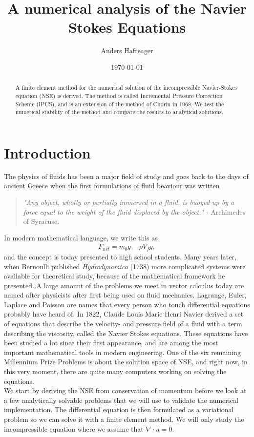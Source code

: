 \documentclass[a4paper,10pt]{article}
\title{A numerical analysis of the Navier Stokes Equations}
\date{\today}
\author{Anders Hafreager}
\renewcommand{\(}{\left(}
\renewcommand{\)}{\right)}
\begin{document}
\maketitle
\begin{abstract}
A finite element method for the numerical solution of the incompressible Navier-Stokes equation (NSE) is derived. The method is called Incremental Pressure Correction Scheme (IPCS)\cite{ns_numerical_solutions}, and is an extension of the method of Chorin in 1968\cite{chorin}. We test the numerical stability of the method and compare the results to analytical solutions.
\end{abstract}

\section{Introduction}
The physics of fluids has been a major field of study and goes back to the days of ancient Greece \cite{wiki_fluid_mechanics} when the first formulations of fluid beaviour was written
\begin{quote}
\textit{"Any object, wholly or partially immersed in a fluid, is buoyed up by a force equal to the weight of the fluid displaced by the object."} - Archimedes of Syracuse.
\end{quote}
In modern mathematical language, we write this as 
\begin{align*}
  F_{net} = m_bg - \rho V_f g,
\end{align*}
and the concept is today presented to high school students. Many years later, when Bernoulli published \textit{Hydrodynamica} (1738) more complicated systems were available for theoretical study, because of the mathematical framework he presented. A large amount of the problems we meet in vector calculus today are named after physicists after first being used on fluid mechanics. Lagrange, Euler, Laplace and Poisson are names that every person who touch differential equations probably have heard of. In 1822, Claude Louis Marie Henri Navier derived a set of equations that describe the velocity- and pressure field of a fluid with a term describing the viscosity, called the Navier Stokes equations.\cite{ns_history} These equations have been studied a lot since their first appearance, and are among the most important mathematical tools in modern engineering. One of the six remaining Millennium Prize Problems is about the solution space of NSE\cite{millennium}, and right now, in this very moment, there are quite many computers working on solving the equations. \\
We start by deriving the NSE from conservation of momentum before we look at a few analytically solvable problems that we will use to validate the numerical implementation. The differential equation is then formulated as a variational problem so we can solve it with a finite element method. We will only study the incompressible equation where we assume that $\nabla \cdot u = 0$. 
 
\end{document}
